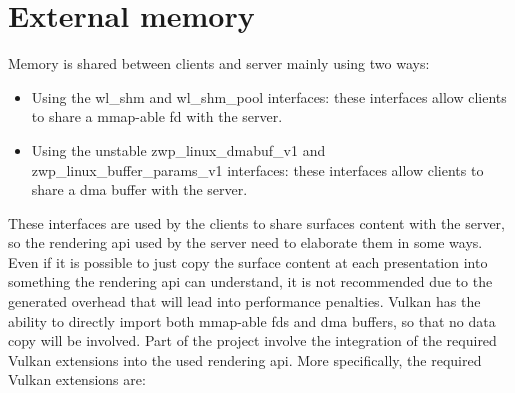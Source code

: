 \section{External memory}
Memory is shared between clients and server mainly using two ways:
\begin{itemize}
	\item Using the wl\_shm and wl\_shm\_pool interfaces: these interfaces allow clients to share a mmap-able fd with the server.
	\item Using the unstable zwp\_linux\_dmabuf\_v1 and zwp\_linux\_buffer\_params\_v1 interfaces: these interfaces allow clients to share a dma buffer with the server. 
\end{itemize}
These interfaces are used by the clients to share surfaces content with the server, so the rendering api used by the server need to elaborate them in some ways. Even if it is possible to just copy the surface content at each presentation into something the rendering api can understand, it is not recommended due to the generated overhead that will lead into performance penalties.
Vulkan has the ability to directly import both mmap-able fds and dma buffers, so that no data copy will be involved. Part of the project involve the integration of the required Vulkan extensions into the used rendering api. 
More specifically, the required Vulkan extensions are:
